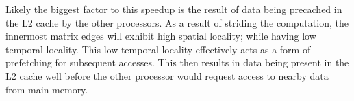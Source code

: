 \documentclass[11pt]{article}
\begin{document}
Likely the biggest factor to this speedup is the result of data being precached in the L2 cache by the other processors.  As a result of striding the computation, the innermost matrix edges will exhibit high spatial locality; while having low temporal locality.  This low temporal locality effectively acts as a form of prefetching for subsequent accesses.  This then results in data being present in the L2 cache well before the other processor would request access to nearby data from main memory.  %

\end{document}
